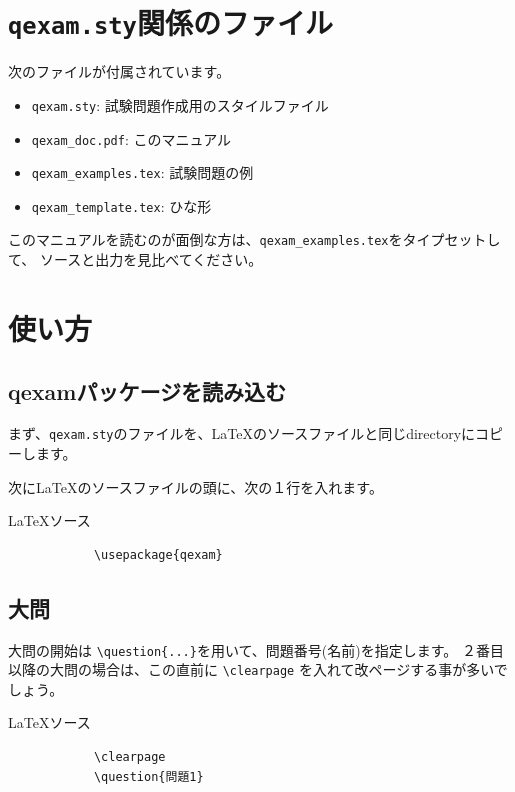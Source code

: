 \documentclass[dvipdfmx,a4j,11pt]{jarticle}
\newenvironment{inputbox}{%
	\begin{itembox}[r]{\LaTeX ソース}
}{
	\end{itembox}
}
\newenvironment{outputbox}{%
	\begin{itembox}[r]{出力}
}{%
	\end{itembox}
}
\begin{document}
\section{{\tt qexam.sty}関係のファイル}
	次のファイルが付属されています。
	\begin{itemize}
		\item {\tt qexam.sty}: 試験問題作成用のスタイルファイル
		\item {\tt qexam\_doc.pdf}: このマニュアル
		\item {\tt qexam\_examples.tex}: 試験問題の例
		\item {\tt qexam\_template.tex}: ひな形
	\end{itemize}
	
	このマニュアルを読むのが面倒な方は、{\tt qexam\_examples.tex}をタイプセットして、
	ソースと出力を見比べてください。
	
\section{使い方}
\subsection{{\bf qexam}パッケージを読み込む}
	まず、{\tt qexam.sty}のファイルを、\LaTeX のソースファイルと同じdirectoryにコピーします。
	
	次に\LaTeX のソースファイルの頭に、次の１行を入れます。
	\begin{inputbox}
		\begin{verbatim}
			\usepackage{qexam}
		\end{verbatim}
	\end{inputbox}
	
		
\subsection{大問}
	大問の開始は
	{\tt \verb"\question{...}"}を用いて、問題番号(名前)を指定します。
	２番目以降の大問の場合は、この直前に
		\verb"\clearpage"
	を入れて改ページする事が多いでしょう。
	\begin{inputbox}
		\begin{verbatim}
			\clearpage
			\question{問題1}
		\end{verbatim}
	\end{inputbox}
	
	
\end{document}
